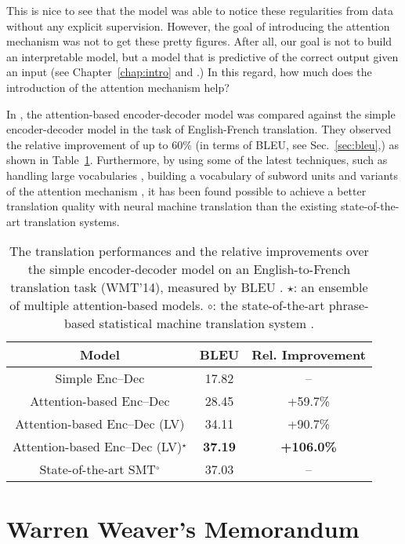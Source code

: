 \documentclass{report}
\begin{document}
This is nice to see that the model was able to notice these regularities from
data without any explicit supervision. However, the goal of introducing the
attention mechanism was not to get these pretty figures. After all, our goal is
not to build an interpretable model, but a model that is predictive of the
correct output given an input (see Chapter~\ref{chap:intro} and
\citet{breiman2001statistical}.) In this regard, how much does the introduction
of the attention mechanism help?

In \citet{bahdanau2014neural}, the attention-based encoder-decoder model was
compared against the simple encoder-decoder model in the task of English-French
translation. They observed the relative improvement of up to 60\% (in terms of
BLEU, see Sec.~\ref{sec:bleu},) as shown in Table~\ref{tab:att_nmt}.
Furthermore, by using some of the latest techniques, such as handling large
vocabularies \citep{jean2014using}, building a vocabulary of subword units
\citep{sennrich2015neural} and variants of the attention mechanism
\citep{luong2015effective}, it has been found possible to achieve a better translation
quality with neural machine translation than the existing state-of-the-art
translation systems.
    

\begin{table}[ht]
    \centering
    \begin{tabular}{c|c|c}
    Model & BLEU & Rel. Improvement \\
    \hline
    \hline
    Simple Enc--Dec & 17.82 &  -- \\
    Attention-based Enc--Dec & 28.45 & +59.7\% \\
    Attention-based Enc--Dec (LV) & 34.11 & +90.7\% \\
    Attention-based Enc--Dec (LV)$^\star$ & \textbf{37.19} & \textbf{+106.0\%} \\
    \hline
    State-of-the-art SMT$^\circ$ & 37.03 & -- 
    \end{tabular}
    \caption{The translation performances and the relative improvements over the
        simple encoder-decoder model on an English-to-French translation task
        (WMT'14),
    measured by BLEU \citep{bahdanau2014neural,jean2014using}. 
$\star$: an ensemble of multiple attention-based models. $\circ$: the
state-of-the-art phrase-based statistical machine translation
system \citep{Durrani2014}.}
    \label{tab:att_nmt}
\end{table}



\section{Warren Weaver's Memorandum}
\end{document}
